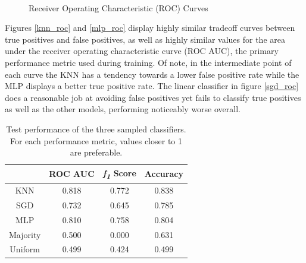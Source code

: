 \documentclass[10pt,conference]{IEEEtran}
\begin{document}
\begin{figure}
  \centering
   \\
  \caption{Receiver Operating Characteristic (ROC) Curves}
  \label{roc_plot}
\end{figure}

Figures \ref{knn_roc} and \ref{mlp_roc} display highly similar tradeoff curves between true positives and false positives, as well as highly similar values for the area under the receiver operating characteristic curve (ROC AUC), the primary performance metric used during training. Of note, in the intermediate point of each curve the KNN has a tendency towards a lower false positive rate while the MLP displays a better true positive rate. The linear classifier in figure \ref{sgd_roc} does a reasonable job at avoiding false positives yet fails to classify true positives as well as the other models, performing noticeably worse overall.


\begin{table}
  \centering
  \begin{tabular}{c|c c c}
    & ROC AUC & \emph{f\textsubscript{1}} Score & Accuracy \\
    \hline
    \hline
    KNN & 0.818 & 0.772 & 0.838 \\
    SGD & 0.732 & 0.645 & 0.785 \\
    MLP & 0.810 & 0.758 & 0.804 \\
    \hline
    Majority & 0.500 & 0.000 & 0.631 \\
    Uniform & 0.499 & 0.424 & 0.499 \\

  \end{tabular}
  \caption{Test performance of the three sampled classifiers. For each performance metric, values closer to 1 are preferable.}
  \label{resultsummary}
\end{table}
\end{document}
